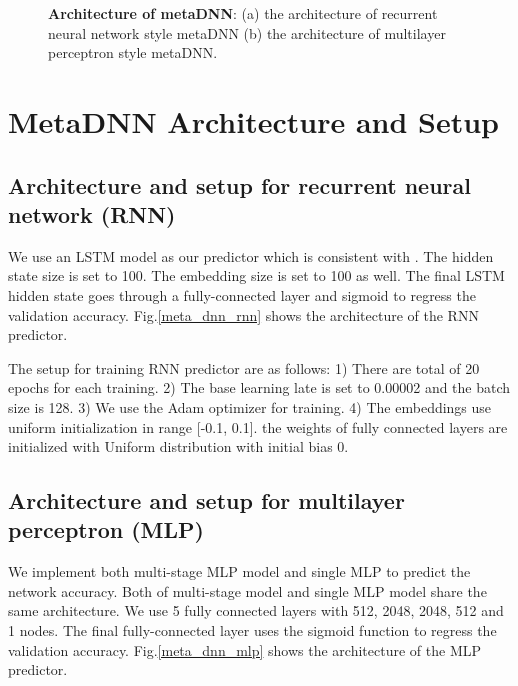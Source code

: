 \documentclass[10pt,twocolumn,letterpaper]{article}
\begin{document}
\begin{figure}[t]
  \begin{center}
     \quad
  \end{center}
\caption{ \textbf{Architecture of metaDNN}: (a) the architecture of recurrent neural network style metaDNN (b) the architecture of multilayer perceptron style metaDNN. }
\label{meda_dnn}
\end{figure}


\section{MetaDNN Architecture and Setup}

\label{ap:metadnn-architecture}

\subsection{Architecture and setup for recurrent neural network (RNN)}
We use an LSTM model as our predictor which is consistent with \cite{liu2017progressive}. The hidden state size is set to 100. The embedding size is set to 100 as well. The final LSTM hidden state goes through a fully-connected layer and sigmoid to regress the validation accuracy. Fig.\ref{meta_dnn_rnn} shows the architecture of the RNN predictor. 

The setup for training RNN predictor are as follows: 1) There are total of 20 epochs for each training. 2) The base learning late is set to 0.00002 and the batch size is 128. 3) We use the Adam optimizer for training. 4) The embeddings use uniform initialization in range [-0.1, 0.1]. the weights of fully connected layers are initialized with Uniform distribution with initial bias 0.

\subsection{Architecture and setup for multilayer perceptron (MLP)}

We implement both multi-stage MLP model and single MLP to predict the network accuracy. Both of multi-stage model and single MLP model share the same architecture. We use 5 fully connected layers with 512, 2048, 2048, 512 and 1 nodes. The final fully-connected layer uses the sigmoid function to regress the validation accuracy. Fig.\ref{meta_dnn_mlp} shows the architecture of the MLP predictor. 
\end{document}
